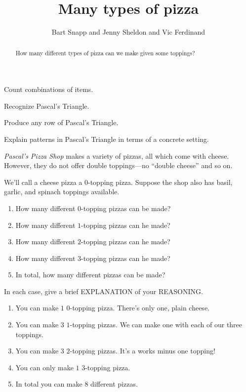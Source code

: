 \documentclass[noauthor,nooutcomes,12pt,hints,handout]{ximera}
\author{Bart Snapp and Jenny Sheldon and Vic Ferdinand}
\title{Many types of pizza}
\begin{document}
\begin{abstract}
  How many different types of pizza can we make given some toppings?
\end{abstract}
\maketitle

\begin{listOutcomes}
\item Count combinations of items.
\item Recognize Pascal's Triangle.
\item Produce any row of Pascal's Triangle.
\item Explain patterns in Pascal's Triangle in terms of a concrete
  setting.
\end{listOutcomes}


\textit{Pascal's Pizza Shop} makes a variety of pizzas, all which come
with cheese.  However, they do not offer double
toppings---no ``double cheese'' and so on.


\mynewpage


\begin{question}
  We'll call a cheese pizza a $0$-topping pizza. Suppose the shop also
  has basil, garlic, and spinach toppings available.
\begin{enumerate}
\item How many different $0$-topping pizzas can be made?
\item How many different $1$-topping pizzas can he made?
\item How many different $2$-topping pizzas can he made?
\item How many different $3$-topping pizzas can he made?
\item In total, how many different pizzas can be made?
\end{enumerate}
In each case, give a brief EXPLANATION of your REASONING.
\begin{freeResponse}
  \begin{enumerate}
  \item You can make $1$ $0$-topping pizza. There's only one, plain
    cheese.
  \item You can make $3$ $1$-topping pizzas. We can make one with each
    of our three toppings.
  \item You can make $3$ $2$-topping pizzas. It's a works minus one topping!
  \item You can only make $1$ $3$-topping pizza.
  \item In total you can make $8$ different pizzas.
  \end{enumerate}
\end{freeResponse}
\end{question}
\mynewpage
\end{document}
